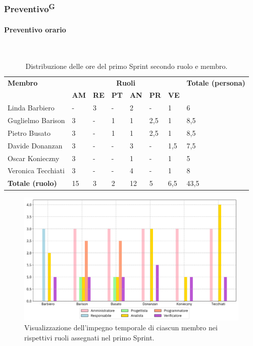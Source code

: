 \documentclass[8pt]{article}
\newcommand{\glossterm}[1]{#1\textsuperscript{G}} %
\newcommand{\subsubsubsection}[1]{\paragraph{#1}\mbox{}\\}
\begin{document}
\subsubsection{\glossterm{Preventivo}}
\subsubsubsection{Preventivo orario}
\begin{table}[ht!]
	\centering
	\begin{tabular}{p{4cm} p{1cm} p{1cm} p{1cm} p{1cm} p{1cm} p{1cm} p{3cm}}
		\toprule
        \textbf{Membro} & \multicolumn{6}{c}{\textbf{Ruoli}} & \textbf{Totale (persona)}\\
		& \textbf{AM} & \textbf{RE} & \textbf{PT} & \textbf{AN} & \textbf{PR} & \textbf{VE}\\
		\midrule
        Linda Barbiero          & -     & 3     & -     & 2     & -     & 1     & 6 \\
        Guglielmo Barison       & 3     & -     & 1     & 1     & 2,5   & 1     & 8,5\\
        Pietro Busato           & 3     & -     & 1     & 1     & 2,5   & 1     & 8,5 \\
        Davide Donanzan         & 3     & -     & -     & 3     & -     & 1,5   & 7,5 \\
        Oscar Konieczny         & 3     & -     & -     & 1     & -     & 1     & 5 \\
        Veronica Tecchiati      & 3     & -     & -     & 4     & -     & 1     & 8 \\
        \bottomrule
        \textbf{Totale (ruolo)} & 15     & 3     & 2     & 12   & 5     & 6,5   & 43,5 \\
	\end{tabular}
	\caption{Distribuzione delle ore del primo Sprint secondo ruolo e membro.}
	\label{table:Distribuzione delle ore del primo Sprint secondo ruolo e membro}
\end{table}
\begin{figure}[ht!]
    \centering
    \includegraphics[width=15cm]{./images_pdp/istogramma_periodo_1.png}
    \caption{Visualizzazione dell'impegno temporale di ciascun membro nei rispettivi ruoli assegnati
    nel primo Sprint.}
    \label{figure:Visualizzazione dell'impegno temporale di ciascun membro nei rispettivi ruoli
    assegnati nel primo Sprint}
\end{figure}
\end{document}
